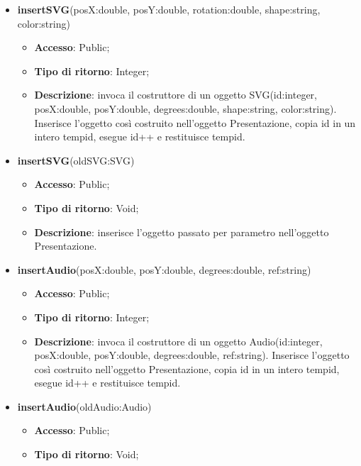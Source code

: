 {{\begin{itemize}
\begin{itemize}
				\item \textbf{Accesso}: Public;
				\item \textbf{Tipo di ritorno}: Void;
				\item \textbf{Descrizione}: inserisce l’oggetto passato per parametro nell’oggetto Presentazione.
			\end{itemize}
			\item \textbf{insertSVG}(posX:double, posY:double, rotation:double, shape:string, color:string)
			\begin{itemize}
				\item \textbf{Accesso}: Public;
				\item \textbf{Tipo di ritorno}: Integer;
				\item \textbf{Descrizione}: invoca il costruttore di un oggetto SVG(id:integer, posX:double, posY:double, degrees:double, shape:string, color:string). Inserisce l’oggetto così costruito nell’oggetto Presentazione, copia id in un intero tempid, esegue id++ e restituisce tempid.
			\end{itemize}
			\item \textbf{insertSVG}(oldSVG:SVG)
			\begin{itemize}
				\item \textbf{Accesso}: Public;
				\item \textbf{Tipo di ritorno}: Void;
				\item \textbf{Descrizione}: inserisce l’oggetto passato per parametro nell’oggetto Presentazione.
			\end{itemize}
			\item \textbf{insertAudio}(posX:double, posY:double, degrees:double, ref:string)
			\begin{itemize}
				\item \textbf{Accesso}: Public;
				\item \textbf{Tipo di ritorno}: Integer;
				\item \textbf{Descrizione}: invoca il costruttore di un oggetto Audio(id:integer, posX:double, posY:double, degrees:double, ref:string). Inserisce l’oggetto così costruito nell’oggetto Presentazione, copia id in un intero tempid, esegue id++ e restituisce tempid.
			\end{itemize}
			\item \textbf{insertAudio}(oldAudio:Audio)
			\begin{itemize}
				\item \textbf{Accesso}: Public;
				\item \textbf{Tipo di ritorno}: Void;

\end{itemize}
\end{itemize}}}
